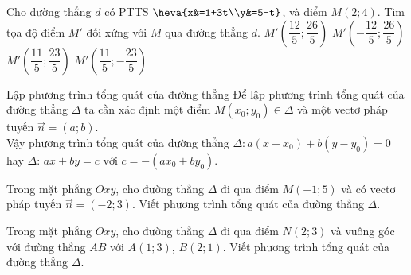 \begin{ex}%
	Cho đường thẳng $d$ có PTTS $\heva{x&=1+3t\\y&=5-t}$, và điểm $M(2;4)$. Tìm tọa độ điểm $M'$ đối xứng với $M$ qua đường thẳng $d$.
	\choice
	{\True $M'\left(\dfrac{12}{5};\dfrac{26}{5}\right)$}
	{$M'\left(-\dfrac{12}{5};\dfrac{26}{5}\right)$}
	{$M'\left(\dfrac{11}{5};\dfrac{23}{5}\right)$}
	{$M'\left(\dfrac{11}{5};-\dfrac{23}{5}\right)$}
\end{ex}
\begin{dang}{Lập phương trình tổng quát của đường thẳng}
	Để lập phương trình tổng quát của đường thẳng $\Delta$ ta cần xác định một điểm $M \left(x_0; y_0 \right) \in \Delta$ và một vectơ pháp tuyến $ \overrightarrow{n} = \left(a; b \right)$.\\
	Vậy phương trình tổng quát của đường thẳng $\Delta \colon a \left(x - x_0 \right) + b \left(y - y_0 \right) = 0$ hay $\Delta$: $ ax + by = c \text{ với } c = - \left(ax_0 + by_0 \right)$.
\end{dang}
\begin{vd}%
	Trong mặt phẳng $Oxy$, cho đường thẳng $\Delta$ đi qua điểm $M(-1;5)$ và có vectơ pháp tuyến $ \overrightarrow{n} = \left(-2;3 \right)$. Viết phương trình tổng quát của đường thẳng $\Delta$.
\end{vd}
\begin{vd}%
	Trong mặt phẳng $Oxy$, cho đường thẳng $\Delta$ đi qua điểm $N(2;3)$ và vuông góc với đường thẳng $AB$ với $A(1;3)$, $B(2;1)$. Viết phương trình tổng quát của đường thẳng $\Delta$.
\end{vd}
